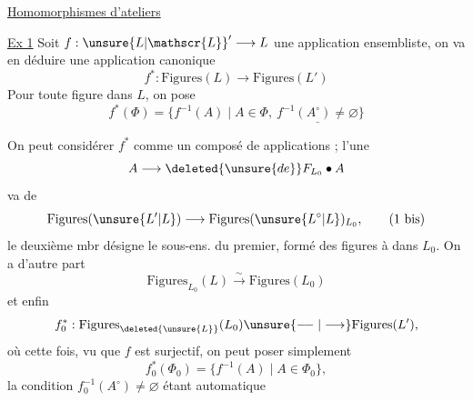 
\uline{Homomorphismes  d'ateliers}


\uline{Ex 1} Soit $f:{\unsure{L|\mathscr{L}}}'\longrightarrow L$ une application ensembliste, on va en déduire une application canonique
\[
f^*:\mathrm{Figures}(L)\longrightarrow\mathrm{Figures}(L')
\]
Pour toute figure  dans $L$, on pose
\[
f^*(\Phi)=\{f^{-1}(A)\mid A\in\Phi,\ \underline{f^{-1}(A^\circ)\ne\varnothing}\}\tag*{(1)}
\]

On peut considérer $f^*$ comme un composé de   applications ; l'une
\[
A\longrightarrow\deleted{\unsure{de}}F_{L_0}\bullet A
\]
va de
\[
\mathrm{Figures}(\unsure{L'|L})\longrightarrow\mathrm{Figures}(\unsure{L^\circ|L})_{L_0},\tag*{(1 bis)}
\]
le deuxième mbr désigne le sous-ens. du premier, formé des figures à  dans $L_0$. On a d'autre part
\[
\mathrm{Figures}_{L_0}(L)\xrightarrow{\sim}\mathrm{Figures}(L_0)\tag*{(1 ter)}
\]
et enfin
\[
f_0^*:\mathrm{Figures}_{\deleted{\unsure{L}}}(L_0)\unsure{\relbar\joinrel\relbar|\longrightarrow}\mathrm{Figures}(L'),
\]
où cette fois, vu que $f$ est surjectif, on peut poser simplement
\[
f_0^*(\Phi_0)=\{f^{-1}(A)\mid A\in\Phi_0\},\tag*{(2)}
\]
la condition $f_0^{-1}(A^\circ)\ne\varnothing$ étant automatique
